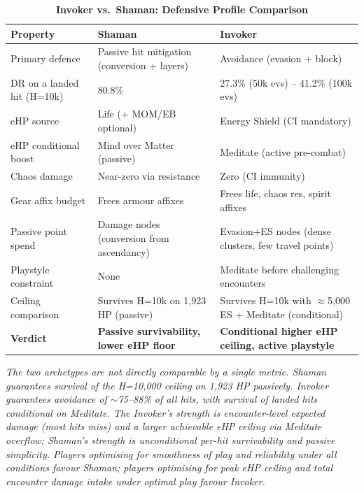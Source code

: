 \documentclass[12pt, letterpaper]{article}
\begin{document}
\begin{table}[htbp]
\centering
\caption{\textbf{Invoker vs.\ Shaman: Defensive Profile Comparison}}
\begin{tabular}{lll}
\toprule
\textbf{Property} & \textbf{Shaman} & \textbf{Invoker} \\
\midrule
\rowcolor{rowalt} Primary defence & Passive hit mitigation (conversion + layers) & Avoidance (evasion + block) \\
DR on a landed hit (H=10k) & 80.8\% & 27.3\% (50k evs) -- 41.2\% (100k evs) \\
\rowcolor{rowalt} eHP source & Life (+ MOM/EB optional) & Energy Shield (CI mandatory) \\
eHP conditional boost & Mind over Matter (passive) & Meditate (active pre-combat) \\
\rowcolor{rowalt} Chaos damage & Near-zero via resistance & Zero (CI immunity) \\
Gear affix budget & Frees armour affixes & Frees life, chaos res, spirit affixes \\
\rowcolor{rowalt} Passive point spend & Damage nodes (conversion from ascendancy) & Evasion+ES nodes (dense clusters, few travel points) \\
Playstyle constraint & None & Meditate before challenging encounters \\
\rowcolor{rowalt} Ceiling comparison & Survives H=10k on 1{,}923 HP (passive) & Survives H=10k with $\approx$5{,}000 ES + Meditate (conditional) \\
\rowcolor{rowhi} \textbf{Verdict} & \textbf{Passive survivability, lower eHP floor} & \textbf{Conditional higher eHP ceiling, active playstyle} \\
\bottomrule
\end{tabular}
\smallskip
\begin{minipage}{\linewidth}
\small\textit{The two archetypes are not directly comparable by a single metric. Shaman guarantees survival of the H=10{,}000 ceiling on 1{,}923 HP passively. Invoker guarantees avoidance of $\sim$75--88\% of all hits, with survival of landed hits conditional on Meditate. The Invoker's strength is encounter-level expected damage (most hits miss) and a larger achievable eHP ceiling via Meditate overflow; Shaman's strength is unconditional per-hit survivability and passive simplicity. Players optimising for smoothness of play and reliability under all conditions favour Shaman; players optimising for peak eHP ceiling and total encounter damage intake under optimal play favour Invoker.}
\end{minipage}
\end{table}
\end{document}
